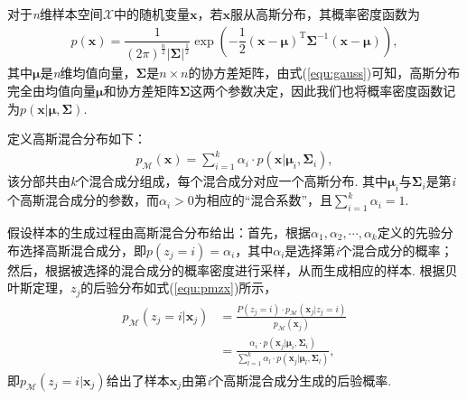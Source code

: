 \documentclass{hitreport}
\begin{document}
对于\textit{n}维样本空间$\mathcal{X}$中的随机变量$\boldsymbol{x}$，若$\boldsymbol{x}$服从高斯分布，其概率密度函数为
\begin{align}\label{equ:gauss}
p\left(\boldsymbol{x}\right) = \dfrac{1}{\left(2\pi\right)^{\frac{n}{2}} \lvert \boldsymbol{\Sigma} \rvert^{\frac{1}{2}}} \exp \left(-\dfrac{1}{2} \left(\boldsymbol{x}-\boldsymbol{\mu}\right)^{\text{T}} \boldsymbol{\Sigma}^{-1} \left(\boldsymbol{x} - \boldsymbol{\mu}\right)\right),
\end{align}
其中$\boldsymbol{\mu}$是\textit{n}维均值向量，$\boldsymbol{\Sigma}$是$n\times n$的协方差矩阵，由式(\ref{equ:gauss})可知，高斯分布完全由均值向量$\boldsymbol{\mu}$和协方差矩阵$\boldsymbol{\Sigma}$这两个参数决定，因此我们也将概率密度函数记为$p\left(\boldsymbol{x} | \boldsymbol{\mu}, \boldsymbol{\Sigma}\right)$.

\begin{definition}[混合高斯分布]
定义高斯混合分布如下：
\begin{align}\label{equ:hmm}
p_{\mathcal{M}}\left(\boldsymbol{x}\right) = \sum\limits_{i=1}^k{\alpha_i\cdot p\left(\boldsymbol{x} | \boldsymbol{\mu}_i, \boldsymbol{\Sigma}_i\right)},
\end{align}
该分部共由\textit{k}个混合成分组成，每个混合成分对应一个高斯分布. 其中$\boldsymbol{\mu}_i$与$\boldsymbol{\Sigma}_i$是第\textit{i}个高斯混合成分的参数，而$\alpha_i>0$为相应的“混合系数”，且$\sum_{i=1}^{k}\alpha_i = 1$.
\end{definition}

假设样本的生成过程由高斯混合分布给出：首先，根据$\alpha_1, \alpha_2, \cdots, \alpha_k$定义的先验分布选择高斯混合成分，即$p\left(z_j = i\right) = \alpha_i$，其中$\alpha_i$是选择第\textit{i}个混合成分的概率；然后，根据被选择的混合成分的概率密度进行采样，从而生成相应的样本. 根据贝叶斯定理，$z_j$的后验分布如式(\ref{equ:pmzx})所示，
\begin{align}\label{equ:pmzx}
\begin{split}
p_{\mathcal{M}}\left(z_j = i|\boldsymbol{x}_j\right) & = \frac{P\left(z_j=i\right)\cdot p_{\mathcal{M}}\left(\boldsymbol{x}_j|z_j = i\right)}{p_{\mathcal{M}}\left(\boldsymbol{x}_j\right)}\\
& = \frac{\alpha_i\cdot p\left(\boldsymbol{x}_j|\boldsymbol{\mu}_i, \boldsymbol{\Sigma}_i\right)}{\sum\limits_{l=1}^{k}\alpha_l\cdot p\left(\boldsymbol{x}_j|\boldsymbol{\mu}_l, \boldsymbol{\Sigma}_l\right)},
\end{split}
\end{align}
即$p_{\mathcal{M}}\left(z_j = i|\boldsymbol{x}_j\right)$给出了样本$\boldsymbol{x}_j$由第\textit{i}个高斯混合成分生成的后验概率.
\end{document}
